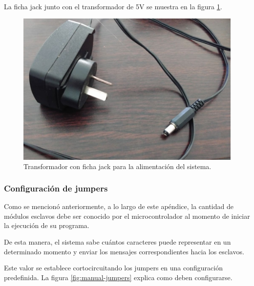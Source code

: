 La ficha jack junto con el transformador de 5V se muestra en la figura \ref{fig:guia-trafo}.

\begin{figure}[!ht]
	\centering
	\includegraphics[width=\linewidth]{imagenes/guia/trafo.jpeg}
	\caption{Transformador con ficha jack para la alimentación del sistema.}
	\label{fig:guia-trafo}
\end{figure}

\clearpage
\subsubsection{Configuración de jumpers}\label{sec:config-jumpers}

Como se mencionó anteriormente, a lo largo de este apéndice, la cantidad de módulos esclavos debe ser conocido por el microcontrolador al momento de iniciar la ejecución de su programa.

De esta manera, el sistema sabe cuántos caracteres puede representar en un determinado momento y enviar los mensajes correspondientes hacia los esclavos.

Este valor se establece cortocircuitando los jumpers en una configuración predefinida. La figura \ref{fig:manual-jumpers} explica como deben configurarse.

